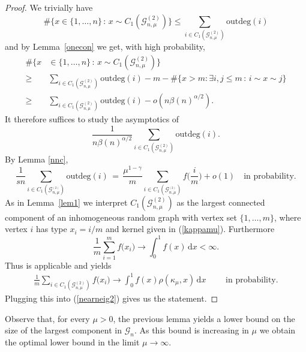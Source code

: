 \documentclass[12pt,a4paper]{article}
\numberwithin{equation}{section}
\begin{document}
\begin{proof} 
We trivially have
$$ \#\big\{x  \in\{1,\dots,n\}\,:\,  x \sim C_1(\mathcal G_{n,\mu}^{(2)}) \}  \le \sum_{i\in C_1(\mathcal G_{n,\mu}^{(2)})} \text{outdeg}(i)$$
and by Lemma~\ref{onecon} we get, with high probability,
\begin{equation*} %
    \begin{aligned}
    \#\big\{x & \in\{1,\dots,n\}\,:\, 
    x \sim C_1(\mathcal G_{n,\mu}^{(2)}) \} 
  \\ \ge \,& \sum_{i\in C_1(\mathcal G_{n,\mu}^{(2)})} \text{outdeg}(i) - m - \#\{x>m \colon \exists i,j\le m \,:\,i\sim x\sim j\}
  \\ \ge \, & \sum_{i\in C_1(\mathcal G_{n,\mu}^{(2)})} \text{outdeg}(i) - o(n\beta(n)^{\alpha/2}).
\end{aligned}
\end{equation*}
It therefore suffices to study the asymptotics of
$$\frac{1}{n\beta(n)^{\alpha/2}} \sum_{i\in C_1(\mathcal G_{n,\mu}^{(2)})} \text{outdeg}(i).$$
By Lemma \ref{nnc}, 
\begin{equation}
\label{nearneig2}
    \frac{1}{sn}\sum_{i\in C_1(\mathcal G_{n,\mu}^{_{(2)}})} \text{outdeg}(i) \,= \,\frac{\mu^{1-\gamma}}{m}\sum_{i\in C_1(\mathcal G_{n,\mu}^{_{(2)}})}f\big(\frac{i}{m}\big) +o(1)\quad \text{in probability.}
\end{equation}
As in Lemma~\ref{lem1} we interpret $C_1(\mathcal G_{n,\mu}^{(2)})$ as the largest connected component of an inhomogeneous random graph with vertex set $\{1,\dots,m\}$, where vertex $i$ has type $x_i=i/m$ and kernel given in (\ref{kappamu}). Furthermore
$$  \frac{1}{m}\sum_{i=1}^m f \big(x_i\big) \to \int_0^1 f(x) \,\text{d}x<\infty.$$
Thus \cite[Theorem 9.10]{rjb} is applicable and yields
\begin{align*}
    \frac{1}{m}\sum_{i\in C_1(\mathcal G_{n,\mu}^{(2)})} f \big( x_i)  {\longrightarrow} \int_0^1 f(x) \rho(\kappa_\mu , x)\,\text{d}x\qquad \text{ in probability.}
\end{align*}
Plugging this into (\ref{nearneig2})  gives us the statement.
\end{proof}

Observe that, for every $\mu>0$, the previous lemma yields a lower bound on the size of the largest component in $\mathscr G_n$. As this bound is increasing in $\mu$ we obtain the optimal lower bound in the limit $\mu\to\infty$. 
\end{document}
